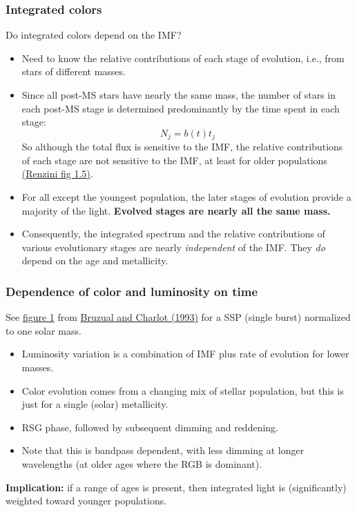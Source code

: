 \documentclass{article}
\begin{document}
\subsubsection{Integrated colors}
Do integrated colors depend on the IMF?
\begin{itemize}
    \item Need to know the relative contributions of each
        stage of evolution, i.e., from stars of different masses.
    \item Since all post-MS stars have nearly the same mass, the number of
        stars in each post-MS stage is determined predominantly by the time
        spent in each stage:
        \[
            N_{j} = b(t)t_{j}
            \]
        So although the total flux is sensitive to the IMF, the relative
        contributions of each stage are not sensitive to the IMF, at least for
        older populations
        \href{http://astronomy.nmsu.edu/holtz/a555/images/renzini5.htm}
        {(Renzini fig 1.5)}.
    \item For all except the youngest population, the later stages of evolution
        provide a majority of the light.  \textbf{Evolved stages are nearly all
        the same mass.}
    \item \textcolor{bred}{Consequently, the integrated spectrum and the
        relative contributions of various evolutionary stages are nearly
        \emph{independent} of the IMF\@.} They \emph{do} depend on the age and
        metallicity.
\end{itemize}

\subsubsection{Dependence of color and luminosity on time}
See \href{http://astronomy.nmsu.edu/holtz/a555/images/bc1.htm}
{figure 1} from \href{http://adsabs.harvard.edu/abs/1993ApJ...405..538B}
{Bruzual and Charlot (1993)}
for a SSP (single burst) normalized to one solar mass.
\begin{itemize}
    \item Luminosity variation is a combination of IMF plus
        rate of evolution for lower masses.
    \item Color evolution comes from a changing mix of stellar population, but
        this is just for a single (solar) metallicity.
    \item RSG phase, followed by subsequent dimming and reddening.
    \item Note that this is bandpass dependent, with less dimming
        at longer wavelengths (at older ages where the RGB is dominant).
\end{itemize}
\textbf{Implication:} if a range of ages is present, then integrated light
is (significantly) weighted toward younger populations.
\end{document}

